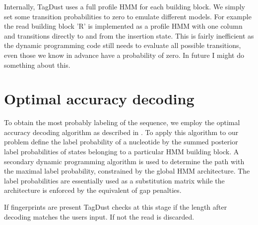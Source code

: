 \documentclass[11pt,a4paper,oneside]{book}
\begin{document}
Internally, TagDust uses a full profile HMM for each building block. We simply set some transition probabilities to zero to emulate different models. For example the read building block 'R' is implemented as a profile HMM with one column and transitions directly to and from the insertion state.
This is fairly inefficient as the dynamic programming code still needs to evaluate all possible transitions, even those we know in advance have a probability of zero. In future I might do something about this. 

\section{Optimal accuracy decoding} 

To obtain the most probably labeling of the sequence, we employ the optimal accuracy decoding algorithm as described in \citep{Kall:2005vg}. To apply this algorithm to our problem define the label probability of a nucleotide by the summed posterior label probabilities of states belonging to a particular HMM building block. A secondary dynamic programming algorithm is used to determine the path with the maximal label probability, constrained by the global HMM architecture. The label probabilities are essentially used as a substitution matrix while the architecture is enforced by the equivalent of gap penalties. 

If fingerprints are present TagDust checks at this stage if the length after decoding matches the users input. If not the read is discarded. 



\end{document}
